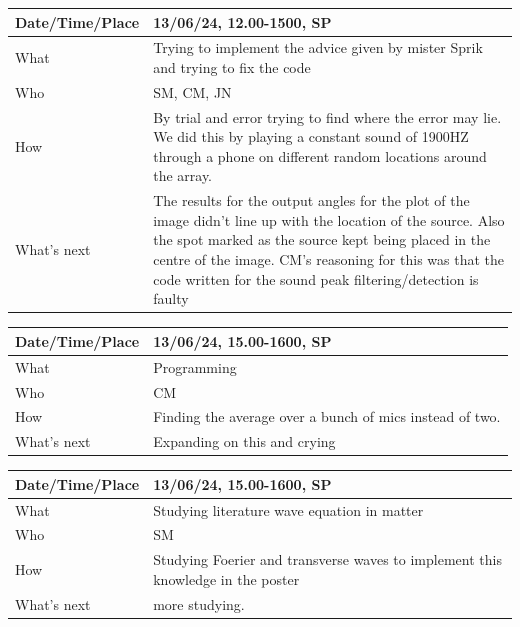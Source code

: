 \documentclass{article}
\begin{document}
\begin{table}[H]
\begin{tabular}{|p{1.5in}|p{4in}|}
\hline
Date/Time/Place & 13/06/24, 12.00-1500, SP \\ \hline
What            & Trying to implement the advice given by mister Sprik and trying to fix the code \\ \hline
Who             & SM, CM, JN \\ \hline
How             & By trial and error trying to find where the error may lie. We did this by playing a constant sound of 1900HZ through a phone on different random locations around the array. \\ \hline
What's next     &  The results for the output angles for the plot of the image didn't line up with the location of the source. Also the spot marked as the source kept being placed in the centre of the image. CM's reasoning for this was that the code written for the sound peak filtering/detection is faulty  \\ \hline
\end{tabular}
\end{table}

\begin{table}[H]
\begin{tabular}{|p{1.5in}|p{4in}|}
\hline
Date/Time/Place & 13/06/24, 15.00-1600, SP \\ \hline
What            &  Programming\\ \hline
Who             &  CM\\ \hline
How             & Finding the average over a bunch of mics instead of two. \\ \hline
What's next     &  Expanding on this and crying \\ \hline
\end{tabular}
\end{table}

\begin{table}[H]
\begin{tabular}{|p{1.5in}|p{4in}|}
\hline
Date/Time/Place & 13/06/24, 15.00-1600, SP \\ \hline
What            & Studying literature wave equation in matter \\ \hline
Who             & SM \\ \hline
How             & Studying Foerier and transverse waves to implement this knowledge in the poster \\ \hline
What's next     & more studying. \\ \hline
\end{tabular}
\end{table}
\end{document}
